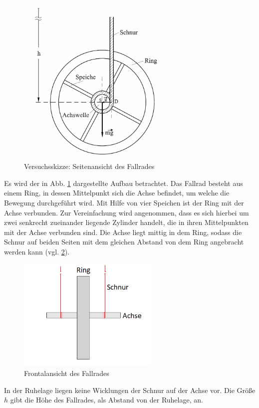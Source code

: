 			\begin{figure}[ht]
				\centering
				\includegraphics[width=0.7\textwidth]{fallrad_skizze.png}
				\caption{Versuchsskizze: Seitenansicht des Fallrades}
				\label{fig:FallradSkizze}	
			\end{figure}
			Es wird der in Abb. \ref{fig:FallradSkizze} dargestellte Aufbau betrachtet. 
			Das Fallrad besteht aus einem Ring, in dessen Mittelpunkt sich die Achse befindet, um welche die Bewegung durchgeführt wird. Mit Hilfe von vier Speichen ist der Ring mit der Achse verbunden. Zur Vereinfachung wird angenommen, dass es sich hierbei um zwei senkrecht zueinander liegende Zylinder handelt, die in ihren Mittelpunkten mit der Achse verbunden sind. 
			Die Achse liegt mittig in dem Ring, sodass die Schnur auf beiden Seiten mit dem gleichen Abstand von dem Ring angebracht werden kann (vgl. \ref{fig:FallradFrontal}). 
			\begin{figure}[ht]
				\centering
				\includegraphics[width=0.6\textwidth]{fallrad_frontal.png}
				\caption{Frontalansicht des Fallrades}
				\label{fig:FallradFrontal}	
			\end{figure}
			In der Ruhelage liegen keine Wicklungen der Schnur auf der Achse vor. Die Größe $h$ gibt die Höhe des Fallrades, als Abstand von der Ruhelage, an. 
		
